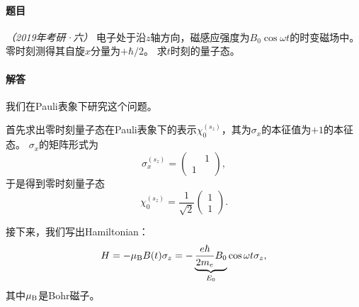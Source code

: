 \begin{tcolorbox}[breakable, title={\textbf{例题}}]
    \paragraph{题目} \textit{（2019年考研·六）}
    电子处于沿$z$轴方向，磁感应强度为$B_0 \cos\omega t$的时变磁场中。零时刻测得其自旋$x$分量为$+\hbar/2$。
    求$t$时刻的量子态。

    \paragraph{解答}
    我们在Pauli表象下研究这个问题。

    首先求出零时刻量子态在Pauli表象下的表示$\chi_0^{(s_z)}$，其为$\sigma_x$的本征值为$+1$的本征态。
    $\sigma_x$的矩阵形式为
    \begin{equation}
        \sigma_x^{(s_z)} = \begin{pmatrix} & 1 \\ 1 & \end{pmatrix},
    \end{equation}
    于是得到零时刻量子态
    \begin{equation}
        \chi_0^{(s_z)} = \frac{1}{\sqrt{2}} \begin{pmatrix} 1 \\ 1 \end{pmatrix}.
    \end{equation}

    接下来，我们写出Hamiltonian：
    \begin{equation}
        H = -\mu_{\rm{B}} B(t) \sigma_z = - \underbrace{\frac{e\hbar}{2m_e} B_0}_{E_0} \cos\omega t \sigma_z,
    \end{equation}
    其中$\mu_{\rm{B}}$是Bohr磁子。


\end{tcolorbox}
